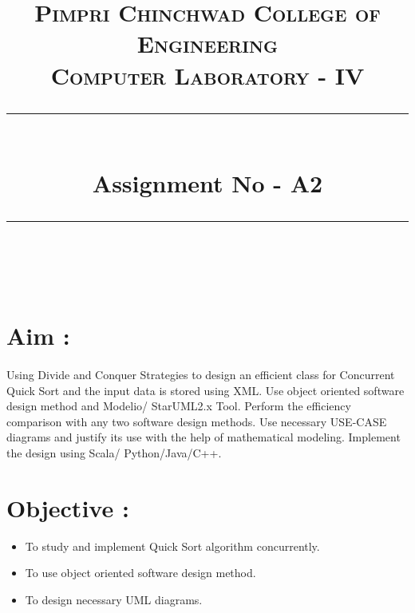 \documentclass[a4paper,12pt]{article}
\title{
	\normalfont \normalsize 
	\textsc{Pimpri Chinchwad College of Engineering \\ 
		Computer Laboratory - IV} \\
	[10pt] 
	\rule{\linewidth}{0.5pt} \\[6pt] 
	\huge Assignment No - A2 \\
	\rule{\linewidth}{2pt}  \\[10pt]
}
\author{}
\date{\normalsize}
\newenvironment{codefont}{\fontfamily{ccr}\selectfont}{\par}
\begin{document}
\maketitle

\section{Aim : }
	\paragraph{} Using Divide and Conquer Strategies to design an efficient class for Concurrent Quick Sort and the input
	data is stored using XML. Use object oriented software design method and Modelio/ StarUML2.x Tool.
	Perform the efficiency comparison with any two software design methods. Use necessary USE-CASE
	diagrams and justify its use with the help of mathematical modeling. Implement the design using Scala/
	Python/Java/C++.
	
\section{Objective : }
	\begin{itemize}
		\item To study and implement Quick Sort  algorithm  concurrently.
		\item To use object oriented software design method.
		\item To design necessary UML diagrams.
	\end{itemize}
		
\end{document}
